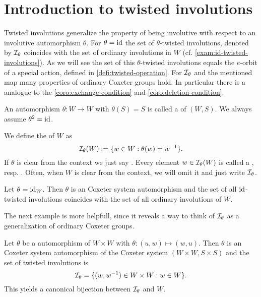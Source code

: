 \section{Introduction to twisted involutions}
\label{sec:twisted-involutions-introduction}

Twisted involutions generalize the property of being involutive with respect to an involutive automorphism $\theta$. For $\theta = \operatorname{id}$ the set of $\theta$-twisted involutions, denoted by $\mathcal{I}_{\theta}$ coincides with the set of ordinary involutions in $W$ (cf. \ref{exam:id-twisted-involutions}). As we will see the set of this $\theta$-twisted involutions equals the $e$-orbit of a special action, defined in \ref{defi:twisted-operation}. For $\mathcal{I}_{\theta}$ and the mentioned map many properties of ordinary Coxeter groups hold. In particular there is a analogue to the \ref{coro:exchange-condition} and \ref{coro:deletion-condition}.

\begin{defi}
	An automorphism $\theta : W \to W$ with $\theta(S) = S$ is called a  of $(W,S)$. We always assume $\theta^2 = \operatorname{id}$.
\end{defi}

\begin{defi}
	We define the  of $W$ as
	$$ \mathcal{I}_{\theta}(W) := \{ w \in W : \theta(w) = w^{-1} \}. $$
	If $\theta$ is clear from the context we just say . Every element $w \in \mathcal{I}_{\theta}(W)$ is called a , resp. . Often, when $W$ is clear from the context, we will omit it and just write $\mathcal{I}_{\theta}$.
\end{defi}

\begin{exam}
	Let $\theta = \operatorname{id}_W$. Then $\theta$ is an Coxeter system automorphism and the set of all $\operatorname{id}$-twisted involutions coincides with the set of all ordinary involutions of $W$.
\end{exam}

The next example is more helpfull, since it reveals a way to think of $\mathcal{I}_{\theta}$ as a generalization of ordinary Coxeter groups.

\begin{exam}
	Let $\theta$ be a automorphism of $W \times W$ with $\theta : (u,w) \mapsto (w,u)$. Then $\theta$ is an Coxeter system automorphism of the Coxeter system $(W \times W, S \times S)$ and the set of twisted involutions is
	$$ \mathcal{I}_{\theta} = \{ (w,w^{-1}) \in W \times W : w \in W \}. $$
	This yields a canonical bijection between $\mathcal{I}_{\theta}$ and $W$.
\end{exam}

